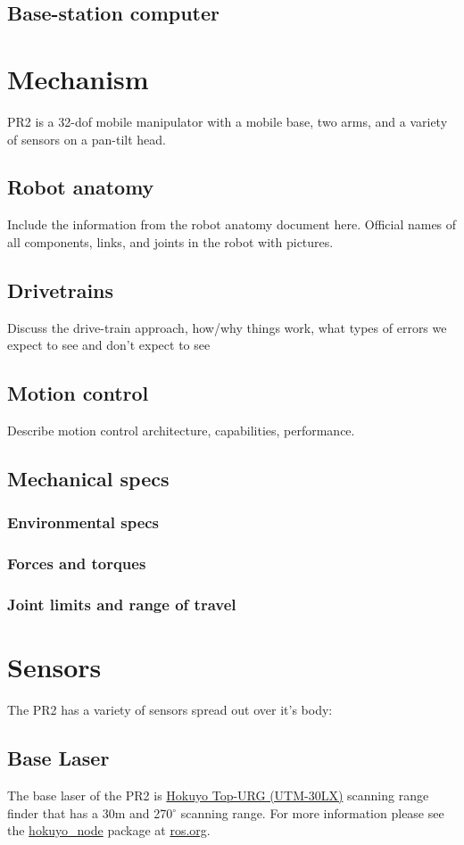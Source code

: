\subsection{Base-station computer}
\section{Mechanism}
PR2 is a 32-dof mobile manipulator with a mobile base, two arms, and a variety of sensors on a pan-tilt head.
\subsection{Robot anatomy}
Include the information from the robot anatomy document here.  Official names of all components, links, and joints in the robot with pictures.
\subsection{Drivetrains}
Discuss the drive-train approach, how/why things work, what types of errors we expect to see and don't expect to see
\subsection{Motion control}
Describe motion control architecture, capabilities, performance.
\subsection{Mechanical specs}
\subsubsection{Environmental specs}
\subsubsection{Forces and torques}
\subsubsection{Joint limits and range of travel}

\section{Sensors}
The PR2 has a variety of sensors spread out over it's body:
\subsection{Base Laser}
The base laser of the PR2 is \href{http://www.hokuyo-aut.jp/02sensor/07scanner/utm_30lx.html}{Hokuyo Top-URG (UTM-30LX)} 
scanning range finder that has a 30m and 270$^\circ$ scanning range. For more information please see the 
\href{http://www.ros.org/wiki/hokuyo_node}{hokuyo\_node} package at \href{http://www.ros.org}{ros.org}.

